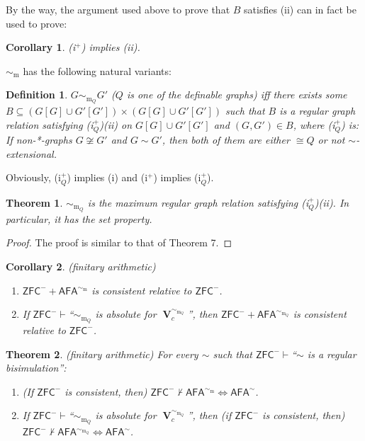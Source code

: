 \documentclass{amsart}
\newcommand{\zfc}{\mathsf{ZFC}}
\newcommand{\afa}{\mathsf{AFA}}
\DeclareMathOperator{\uni}{\mathbf{V}}
\newtheorem{theorem}{Theorem}
\newtheorem{definition}{Definition}
\newtheorem{corollary}{Corollary}
\begin{document}
By the way, the argument used above to prove that $B$ satisfies (ii) can in fact be used to prove:

\begin{corollary}
    (i$^+$) implies (ii).
\end{corollary}

$\sim_\mathrm{m}$ has the following natural variants:

\begin{definition}
    $G\sim_{\mathrm{m}_Q}G'$ ($Q$ is one of the definable graphs) iff there exists some $B\subseteq (G[G]\cup G'[G'])\times(G[G]\cup G'[G'])$ such that $B$ is a regular graph relation satisfying (i$_Q^+$)(ii) on $G[G]\cup G'[G']$ and $(G,G')\in B$, where (i$_Q^+$) is: If non-*-graphs $G\not\cong G'$ and $G\sim G'$, then both of them are either $\cong Q$ or not $\sim$-extensional.
\end{definition}

Obviously, (i$_Q^+$) implies (i) and (i$^+$) implies (i$_Q^+$).

\begin{theorem}
    $\sim_{\mathrm{m}_Q}$ is the maximum regular graph relation satisfying (i$_Q^+$)(ii). In particular, it has the set property.
\end{theorem}
\begin{proof}
    The proof is similar to that of Theorem 7.
\end{proof}

\begin{corollary}
(finitary arithmetic)
    \begin{enumerate}[label=(\arabic*)]
        \item $\zfc^-+\afa^{\sim_\mathrm{m}}$ is consistent relative to $\zfc^-$.
        \item If $\zfc^-\vdash$``$\sim_{\mathrm{m}_Q}$ is absolute for $\uni_c^{\sim_{\mathrm{m}_Q}}$'', then $\zfc^-+\afa^{\sim_{\mathrm{m}_Q}}$ is consistent relative to $\zfc^-$.
    \end{enumerate}
\end{corollary}

\begin{theorem} (finitary arithmetic) For every $\sim$ such that $\zfc^-\vdash$``$\sim$ is a regular bisimulation'':
\begin{enumerate}[label=(\arabic*)]
        \item (If $\zfc^-$ is consistent, then) $\zfc^-\not\vdash\afa^{\sim_\mathrm{m}}\Leftrightarrow\afa^\sim$.
        \item If $\zfc^-\vdash$``$\sim_{\mathrm{m}_Q}$ is absolute for $\uni_c^{\sim_{\mathrm{m}_Q}}$'', then (if $\zfc^-$ is consistent, then) $\zfc^-\not\vdash\afa^{\sim_{\mathrm{m}_Q}}\Leftrightarrow\afa^\sim$.
    \end{enumerate}
\end{theorem}
\end{document}
